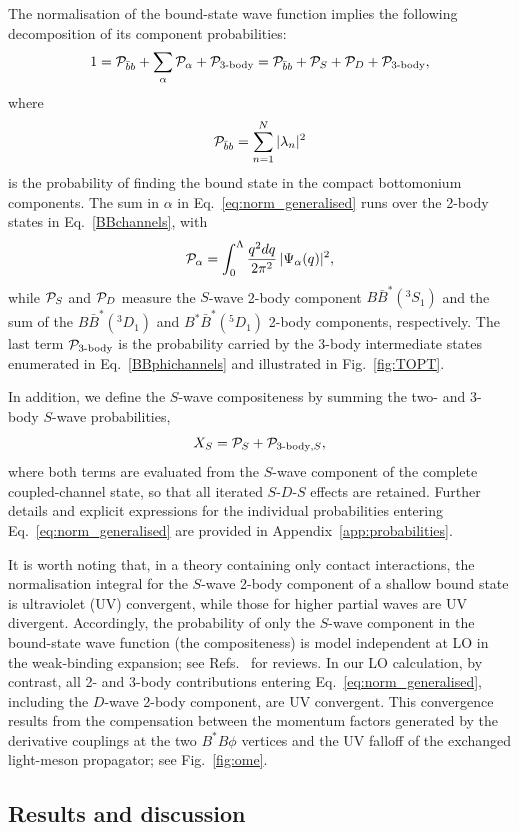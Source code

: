 \documentclass[aps,prd,showpacs,amsmath,twocolumn,superscriptaddress,floatfix,nofootinbib,notitlepage]{revtex4-2}
\newcommand{\be}{\begin{equation}}
\newcommand{\ee}{\end{equation}}
\newcommand{\dqr}{\frac{q^2dq}{2\pi^2}}
\begin{document}
The normalisation of the bound-state wave function implies the following decomposition of its component probabilities:
\be
1={\cal P}_{\bar{b}b} +\sum_{\alpha}{\cal P}_\alpha+{\cal P}_{\text{3-body}}=
{\cal P}_{\bar{b}b} +{\cal P}_S+{\cal P}_D+{\cal P}_{\text{3-body}},
\label{eq:norm_generalised}
\ee
where 
\be
{\cal P}_{\bar{b}b}
=\sum_{n=1}^N|\lambda_n|^2
\label{Pbb}
\ee
is the probability of finding the bound state in the compact bottomonium components. The sum in $\alpha$ in Eq.~\eqref{eq:norm_generalised} runs over the 2-body states in Eq.~\eqref{BBchannels}, with
\be
{\cal P}_\alpha=\int_0^\Lambda\dqr\,|\Psi_\alpha(q)|^2,
\label{eq:P-2body}
\ee
while ${\cal P}_S$ and ${\cal P}_D$ measure the $S$-wave 2-body component $B\bar{B}^*(^3S_1)$ and the sum of the $B\bar{B}^*(^3D_1)$ and $B^*\bar{B}^*(^5D_1)$ 2-body components, respectively. The last term ${\cal P}_{\text{3-body}}$ is the probability carried by the 3-body intermediate states
enumerated in Eq.~\eqref{BBphichannels} and illustrated in Fig.~\ref{fig:TOPT}.

In addition, we define the $S$-wave compositeness by summing the two- and 3-body $S$-wave probabilities,
\be
X_S={\cal P}_S+{\cal P}_{\text{3-body},S},
\label{eq:XS}
\ee
where both terms are evaluated from the $S$-wave component of the complete coupled-channel state, so that all iterated $S$-$D$-$S$ effects are retained. Further details and explicit expressions for the individual probabilities entering Eq.~\eqref{eq:norm_generalised} are provided in Appendix~\ref{app:probabilities}.

It is worth noting that, in a theory containing only contact interactions, the normalisation integral for the $S$-wave 2-body component of a shallow bound state is ultraviolet (UV) convergent, while those for higher partial waves are UV divergent. Accordingly, the probability of only the $S$-wave component in the bound-state wave function (the compositeness) is model independent at LO in the weak-binding expansion; see Refs.~\cite{Guo:2017jvc,Hyodo:2013nka,Kinugawa:2024crb} for reviews. In our LO calculation, by contrast, all 2- and 3-body contributions entering Eq.~\eqref{eq:norm_generalised}, including the $D$-wave 2-body component, are UV convergent. This convergence results from the compensation between the momentum factors generated by the derivative couplings at the two $B^*B\phi$ vertices and the UV falloff of the exchanged light-meson propagator; see Fig.~\ref{fig:ome}.

\subsection{Results and discussion}
\label{sec:Xb}
\end{document}
